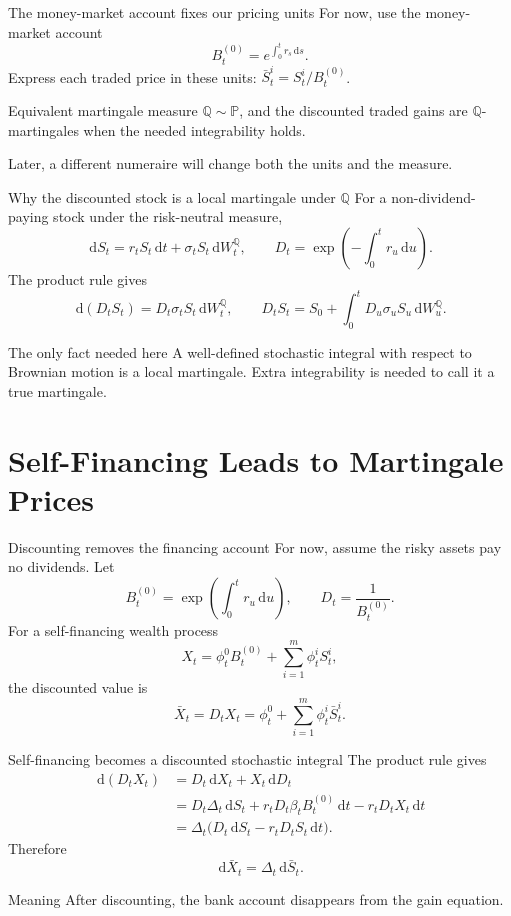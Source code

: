 \documentclass[handout,10pt,aspectratio=169]{beamer}
\newcommand{\dd}{\,\mathrm d}
\newcommand{\Pp}{\mathbb P}
\newcommand{\Q}{\mathbb Q}
\newcommand{\1}{\mathbf 1}
\begin{document}
\begin{frame}{The money-market account fixes our pricing units}
For now, use the money-market account
\[
B_t^{(0)}=e^{\int_0^tr_s\dd s}.
\]
Express each traded price in these units:
\(\bar S_t^i=S_t^i/B_t^{(0)}\).
\begin{block}{Equivalent martingale measure}
\(\Q\sim\Pp\), and the discounted traded gains are
\(\Q\)-martingales when the needed integrability holds.
\end{block}
Later, a different numeraire will change both the units and the measure.
\end{frame}

\begin{frame}{Why the discounted stock is a local martingale under \(\Q\)}
For a non-dividend-paying stock under the risk-neutral measure,
\[
\dd S_t=r_tS_t\dd t+\sigma_tS_t\dd W_t^\Q,
\qquad D_t=\exp\!\left(-\int_0^t r_u\dd u\right).
\]
The product rule gives
\[
\dd(D_tS_t)=D_t\sigma_tS_t\dd W_t^\Q,
\qquad
D_tS_t=S_0+\int_0^tD_u\sigma_uS_u\dd W_u^\Q.
\]
\begin{block}{The only fact needed here}
A well-defined stochastic integral with respect to Brownian motion is a
local martingale. Extra integrability is needed to call it a true martingale.
\end{block}
\end{frame}

\section{Self-Financing Leads to Martingale Prices}



\begin{frame}{Discounting removes the financing account}
For now, assume the risky assets pay no dividends. Let
\[
B_t^{(0)}=\exp\!\left(\int_0^t r_u\dd u\right),
\qquad
D_t=\frac1{B_t^{(0)}}.
\]
For a self-financing wealth process
\[
X_t=\phi_t^0B_t^{(0)}+\sum_{i=1}^m\phi_t^iS_t^i,
\]
the discounted value is
\[
\bar X_t=D_tX_t
=\phi_t^0+\sum_{i=1}^m\phi_t^i\bar S_t^i.
\]
\end{frame}


\begin{frame}{Self-financing becomes a discounted stochastic integral}
The product rule gives
\[
\begin{aligned}
\dd(D_tX_t)
&=D_t\dd X_t+X_t\dd D_t\\
&=D_t\Delta_t\dd S_t
  +r_tD_t\beta_tB_t^{(0)}\dd t-r_tD_tX_t\dd t\\
&=\Delta_t\bigl(D_t\dd S_t-r_tD_tS_t\dd t\bigr).
\end{aligned}
\]
Therefore
\[
\boxed{\dd\bar X_t=\Delta_t\dd\bar S_t.}
\]
\begin{block}{Meaning}
After discounting, the bank account disappears from the gain equation.
\end{block}
\end{frame}
\end{document}
